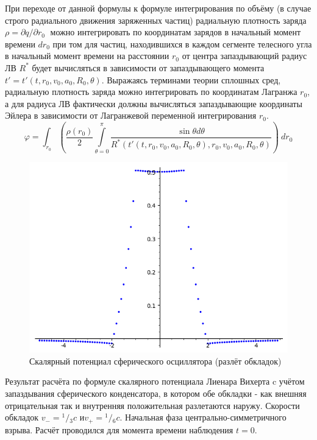 \documentclass[12pt]{article}
\begin{document}
При переходе от данной формулы к формуле интегрирования по объёму (в случае строго радиального движения заряженных частиц) радиальную плотность заряда ${\rho =\partial q}/{\partial {{r}_{0}}}\;$ можно интегрировать по координатам зарядов в начальный момент времени $d{{r}_{0}}$ при том для частиц, находившихся в каждом сегменте телесного угла в начальный момент времени на расстоянии ${{r}_{0}}$ от центра запаздывающий радиус ЛВ ${{R}^{*}}$ будет вычисляться в зависимости от запаздывающего момента $t'=t'\left( t,{{r}_{0}},{{v}_{0}},{{a}_{0}},{{R}_{0}},\theta  \right)$. Выражаясь терминами теории сплошных сред, радиальную плотность заряда можно интегрировать по координатам Лагранжа ${{r}_{0}}$, а для радиуса ЛВ фактически должны вычисляться запаздывающие координаты Эйлера в зависимости от Лагранжевой переменной интегрирования ${{r}_{0}}$.
	\[\varphi =\int_{{{r}_{0}}}{\left( \frac{\rho \left( {{r}_{0}} \right)}{2}\int\limits_{\theta =0}^{\pi }{\frac{\sin \theta d\theta }{{{R}^{*}}\left( t'\left( t,{{r}_{0}},{{v}_{0}},{{a}_{0}},{{R}_{0}},\theta  \right),{{r}_{0}},{{v}_{0}},{{a}_{0}},{{R}_{0}},\theta  \right)}} \right)}\ d{{r}_{0}}\]

\begin{figure}
    \centering
    \includegraphics[scale=0.3]{spherical_oscillator_phi_Rneg=2_Rpos=1_v0neg=1_v0pos=0_5_a0neg=0_a0pos=0c=3_t=0}
    \caption{Скалярный потенциал сферического осциллятора (разлёт обкладок)}
    \label{fig:spherical_oscillator_phi_Rneg=2_Rpos=1_v0neg=1_v0pos=0_5_a0neg=0_a0pos=0c=3_t=0}
\end{figure}

Результат расчёта по формуле  скалярного потенциала Лиенара Вихерта c учётом запаздывания сферического конденсатора, в котором обе обкладки - как внешняя отрицательная  так и внутренняя положительная разлетаются наружу. Скорости обкладок ${{v}_{-}}={}^{1}/{}_{3}c$ и${{v}_{+}}={}^{1}/{}_{6}c$. Начальная фаза центрально-симметричного взрыва. Расчёт проводился для момента времени наблюдения $t=0$.
\end{document}
